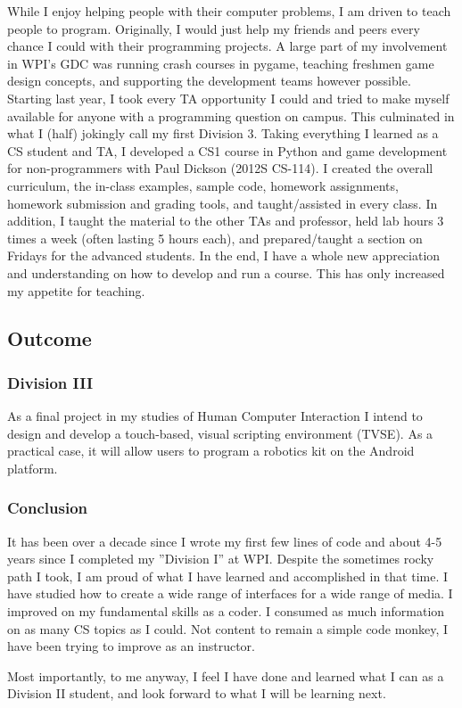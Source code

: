 While I enjoy helping people with their computer problems, I am driven
to teach people to program. Originally, I would just help my friends
and peers every chance I could with their programming projects. A
large part of my involvement in WPI’s GDC was running crash courses
in pygame, teaching freshmen game design concepts, and supporting the
development teams however possible. Starting last year, I took every
TA opportunity I could and tried to make myself available for anyone
with a programming question on campus. This culminated in what I (half)
jokingly call my first Division 3. Taking everything I learned as a CS
student and TA, I developed a CS1 course in Python and game development
for non-programmers with Paul Dickson (2012S CS-114). I created the
overall curriculum, the in-class examples, sample code, homework
assignments, homework submission and grading tools, and taught/assisted
in every class. In addition, I taught the material to the other TAs and
professor, held lab hours 3 times a week (often lasting 5 hours each),
and prepared/taught a section on Fridays for the advanced students.
In the end, I have a whole new appreciation and understanding on how
to develop and run a course. This has only increased my appetite for
teaching.

\subsection*{Outcome}

\subsubsection{Division III}

As a final project in my studies of Human Computer Interaction I
intend to design and develop a touch-based, visual scripting environment
(TVSE). As a practical case, it will allow users to program a robotics
kit on the Android platform.

\subsubsection*{Conclusion}
It has been over a decade since I wrote my first few lines of code and
about 4-5 years since I completed my ”Division I” at WPI. Despite
the sometimes rocky path I took, I am proud of what I have learned and
accomplished in that time. I have studied how to create a wide range
of interfaces for a wide range of media. I improved on my fundamental
skills as a coder. I consumed as much information on as many CS topics
as I could. Not content to remain a simple code monkey, I have been
trying to improve as an instructor.

Most importantly, to me anyway, I feel I have done and learned what
I can as a Division II student, and look forward to what I will be
learning next.
